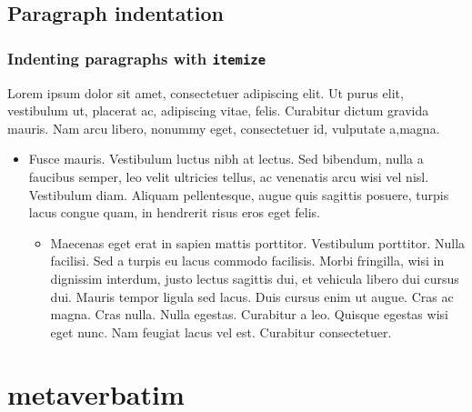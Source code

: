 \documentclass[12pt,a4paper]{article}
\theoremstyle{definition}
\theoremstyle{remark}
\begin{document}
\subsection{Paragraph indentation}\label{sec:par_indentation}

\lipsum[1]

\setlength{\leftskip}{2cm}
\lipsum[2]

\setlength{\leftskip}{0pt}
\lipsum[3]


\newenvironment{myindentpar}[1]%
{\begin{list}{}
         {\setlength{\leftmargin}{#1}}
         \item[]
}
{\end{list}}

\begin{myindentpar}{5em}
\lipsum[4]
\end{myindentpar}

\lipsum[1]
\newpage
\subsubsection{Indenting paragraphs with \texttt{itemize}}
Lorem ipsum dolor sit amet, consectetuer adipiscing elit. Ut purus elit, vestibulum ut, placerat ac, adipiscing vitae, felis. Curabitur dictum gravida mauris. Nam arcu libero, nonummy eget, consectetuer id, vulputate a,magna.
\begin{itemize}
\item[]
	Fusce mauris. Vestibulum luctus nibh at lectus. Sed bibendum, nulla a faucibus semper, leo velit ultricies tellus, ac venenatis arcu wisi vel nisl. Vestibulum diam. Aliquam pellentesque, augue quis sagittis posuere, turpis lacus congue quam, in hendrerit risus eros eget felis.
\begin{itemize}
\item[]
Maecenas eget erat in sapien mattis porttitor.
Vestibulum porttitor. Nulla facilisi. Sed a turpis eu lacus commodo
facilisis. Morbi fringilla, wisi in dignissim interdum, justo lectus
sagittis dui, et vehicula libero dui cursus dui. Mauris tempor ligula
sed lacus. Duis cursus enim ut augue. Cras ac magna. Cras nulla.
Nulla egestas. Curabitur a leo. Quisque egestas wisi eget nunc.
Nam feugiat lacus vel est. Curabitur consectetuer.
\end{itemize} 
\end{itemize}



\section{metaverbatim}
\end{document}
